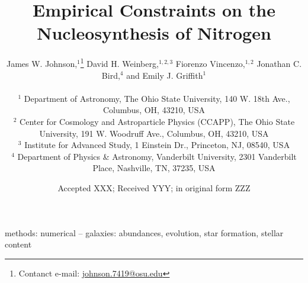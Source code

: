 \documentclass[fleqn, usenatbib]{mnras}
\title[Empirical Constraints on the Nucleosynthesis of Nitrogen]{Empirical 
Constraints on the Nucleosynthesis of Nitrogen}
\author[J.W. Johnson et al.]{James W. Johnson,$^{1}$\thanks{
	Contanct e-mail: \href{mailto:
	johnson.7419@osu.edu}{johnson.7419@osu.edu}} 
	David H. Weinberg,$^{1, 2, 3}$ 
	Fiorenzo Vincenzo,$^{1, 2}$ 
	Jonathan C. Bird,$^{4}$ 
	\newauthor 
	and Emily J. Griffith$^{1}$ 
	\\ \null \\ 
	$^{1}$ Department of Astronomy, The Ohio State University, 
	140 W. 18th Ave., Columbus, OH, 43210, USA 
	\\ 
	$^{2}$ Center for Cosmology and Astroparticle Physics (CCAPP), 
	The Ohio State University, 191 W. Woodruff Ave., Columbus, OH, 43210, USA 
	\\ 
	$^{3}$ Institute for Advanced Study, 1 Einstein Dr., Princeton, NJ, 08540, 
	USA 
	\\ 
	$^{4}$ Department of Physics \& Astronomy, Vanderbilt University, 
	2301 Vanderbilt Place, Nashville, TN, 37235, USA 
}
\date{Accepted XXX; Received YYY; in original form ZZZ}
\begin{document}
 
\label{firstpage} 
\pagerange{\pageref{firstpage}--\pageref{lastpage}} 
\maketitle 

 

\begin{keywords} 
methods: numerical -- galaxies: abundances, evolution, star formation, stellar 
content 
\end{keywords} 

 
 
 
 
 
 

 
 

\label{lastpage} 
\end{document}
